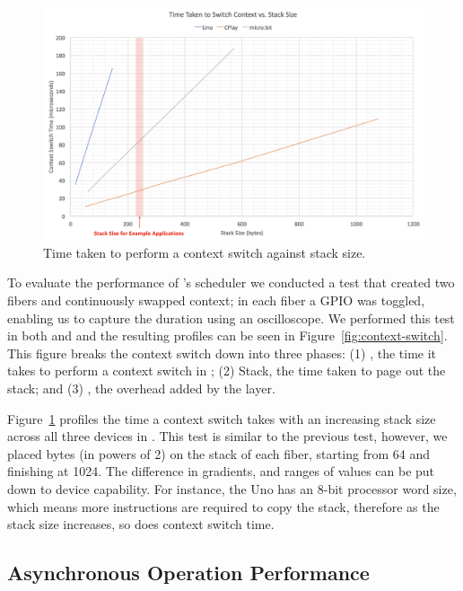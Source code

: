 \begin{figure}[ht]
    \includegraphics[width=.9\columnwidth]{images/context-vs-stack.png}
\caption{\label{fig:context-vs-stack}Time taken to perform a context switch against stack size.}
\end{figure}

To evaluate the performance of \CON's scheduler we conducted a test that created two fibers and continuously swapped context; in each fiber a GPIO was toggled, enabling us to capture the duration using an oscilloscope. We performed this test in both \MC and \CO and the resulting profiles can be seen in Figure~\ref{fig:context-switch}. This figure breaks the context switch down into three phases: (1) \CO, the time it takes to perform a context switch in \CO; (2) Stack, the time taken to page out the \MC stack; and (3) \MC, the overhead added by the \MC layer.

Figure~\ref{fig:context-vs-stack} profiles the time a context switch takes with an increasing stack size across all three devices in \CO. This test is similar to the previous test, however, we placed bytes (in powers of 2) on the stack of each fiber, starting from 64 and finishing at 1024. The difference in gradients, and ranges of values can be put down to device capability. For instance, the Uno has an 8-bit processor word size, which means more instructions are required to copy the stack, therefore as the stack size increases, so does context switch time.

\subsection{Asynchronous Operation Performance}

